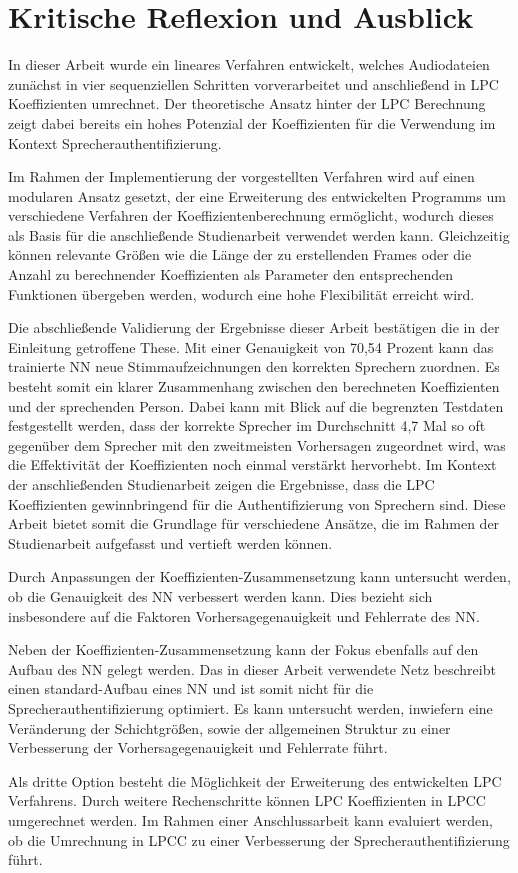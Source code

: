\section{Kritische Reflexion und Ausblick}\label{sec:Ausblick}
In dieser Arbeit wurde ein lineares Verfahren entwickelt, welches Audiodateien zunächst in vier sequenziellen Schritten vorverarbeitet und anschließend in \ac{LPC} Koeffizienten umrechnet.
Der theoretische Ansatz hinter der \ac{LPC} Berechnung zeigt dabei bereits ein hohes Potenzial der Koeffizienten für die Verwendung im Kontext Sprecherauthentifizierung.

Im Rahmen der Implementierung der vorgestellten Verfahren wird auf einen modularen Ansatz gesetzt, der eine Erweiterung des entwickelten Programms um verschiedene Verfahren der Koeffizientenberechnung ermöglicht, wodurch dieses als Basis für die anschließende Studienarbeit verwendet werden kann.
Gleichzeitig können relevante Größen wie die Länge der zu erstellenden Frames oder die Anzahl zu berechnender Koeffizienten als Parameter den entsprechenden Funktionen übergeben werden, wodurch eine hohe Flexibilität erreicht wird.

Die abschließende Validierung der Ergebnisse dieser Arbeit bestätigen die in der Einleitung getroffene These.
Mit einer Genauigkeit von 70,54 Prozent kann das trainierte \ac{NN} neue Stimmaufzeichnungen den korrekten Sprechern zuordnen.
Es besteht somit ein klarer Zusammenhang zwischen den berechneten Koeffizienten und der sprechenden Person.
Dabei kann mit Blick auf die begrenzten Testdaten festgestellt werden, dass der korrekte Sprecher im Durchschnitt 4,7 Mal so oft gegenüber dem Sprecher mit den zweitmeisten Vorhersagen zugeordnet wird, was die Effektivität der Koeffizienten noch einmal verstärkt hervorhebt.
\newline
\newline
Im Kontext der anschließenden Studienarbeit zeigen die Ergebnisse, dass die \ac{LPC} Koeffizienten gewinnbringend für die Authentifizierung von Sprechern sind.
Diese Arbeit bietet somit die Grundlage für verschiedene Ansätze, die im Rahmen der Studienarbeit aufgefasst und vertieft werden können.

Durch Anpassungen der Koeffizienten-Zusammensetzung kann untersucht werden, ob die Genauigkeit des \ac{NN} verbessert werden kann.
Dies bezieht sich insbesondere auf die Faktoren Vorhersagegenauigkeit und Fehlerrate des \ac{NN}.

Neben der Koeffizienten-Zusammensetzung kann der Fokus ebenfalls auf den Aufbau des \ac{NN} gelegt werden.
Das in dieser Arbeit verwendete Netz beschreibt einen standard-Aufbau eines \ac{NN} und ist somit nicht für die Sprecherauthentifizierung optimiert.
Es kann untersucht werden, inwiefern eine Veränderung der Schichtgrößen, sowie der allgemeinen Struktur zu einer Verbesserung der Vorhersagegenauigkeit und Fehlerrate führt.

Als dritte Option besteht die Möglichkeit der Erweiterung des entwickelten \ac{LPC} Verfahrens.
Durch weitere Rechenschritte können \ac{LPC} Koeffizienten in \ac{LPCC} umgerechnet werden.
Im Rahmen einer Anschlussarbeit kann evaluiert werden, ob die Umrechnung in \ac{LPCC} zu einer Verbesserung der Sprecherauthentifizierung führt.